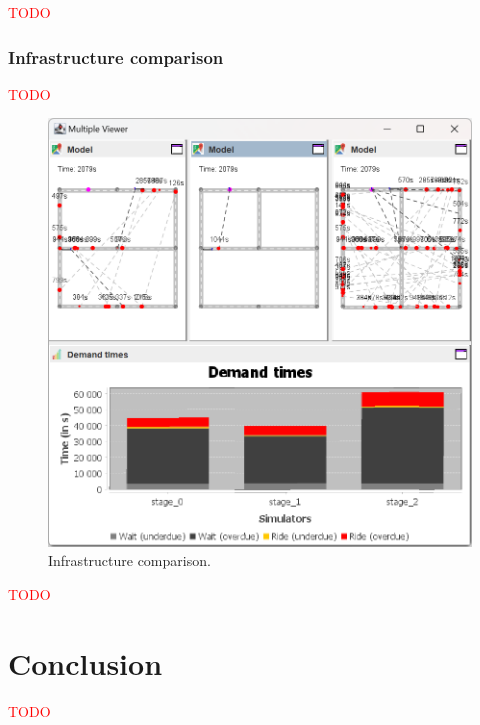 \documentclass[10pt,twocolumn]{article}
\begin{document}
\textcolor{red}{TODO}

\subsubsection{Infrastructure comparison}
\label{sec:infrastructure-comparison}

\textcolor{red}{TODO}

\begin{figure}[!ht]
    \includegraphics[width=\columnwidth]{infrastructure_comparison.png}
    \caption{Infrastructure comparison.}
    \label{fig:infratructure-comparison}
\end{figure}

\textcolor{red}{TODO}

\section{Conclusion}
\label{sec:conclusion}

\textcolor{red}{TODO}



\end{document}
